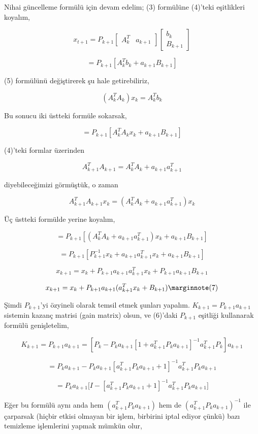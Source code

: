 \documentclass[12pt,fleqn]{article}\usepackage{../../common}
\begin{document}
Nihai güncelleme formülü için devam edelim; (3) formülüne (4)'teki
eşitlikleri koyalım,

$$ x_{t+1} = 
P_{k+1} 
\left[\begin{array}{cc} A_k^T & a_{k+1} \end{array}\right]  
\left[\begin{array}{c} b_k \\ B_{k+1} \end{array}\right]  
$$

$$ = P_{k+1} [A_k^Tb_k + a_{k+1}B_{k+1} ] $$

(5) formülünü değiştirerek şu hale getirebiliriz,

$$ (A_k^TA_k) x_k = A_k^T b_k $$

Bu sonucu iki üstteki formüle sokarsak, 

$$ = P_{k+1} [A_k^TA_kx_k + a_{k+1}B_{k+1} ] $$

(4)'teki formlar üzerinden 

$$ A_{k+1}^TA_{k+1} =  A_k^TA_k + a_{k+1}a_{k+1}^T  $$

diyebileceğimizi görmüştük, o zaman 

$$ A_{k+1}^TA_{k+1}x_k =  (A_k^TA_k + a_{k+1}a_{k+1}^T)x_k  $$

Üç üstteki formülde yerine koyalım,

$$ = P_{k+1} [(A_k^TA_k + a_{k+1}a_{k+1}^T)x_k + a_{k+1}B_{k+1} ] $$

$$ = P_{k+1} [P_{k+1}^{-1}x_k + a_{k+1}a_{k+1}^Tx_k + a_{k+1}B_{k+1} ] $$

$$ x_{k+1} = x_k + P_{k+1}a_{k+1}a_{k+1}^Tx_k  + P_{k+1}a_{k+1}B_{k+1}  $$

$$ 
x_{k+1} = x_k + P_{k+1}a_{k+1}(a_{k+1}^Tx_k  + B_{k+1})  
\mlabel{7}
$$

Şimdi $P_{k+1}$'yi özyineli olarak temsil etmek şunları yapalım. $K_{k+1} =
P_{k+1}a_{k+1}$  sistemin kazanç matrisi (gain matrix) olsun, ve (6)'daki 
$P_{k+1}$ eşitliği kullanarak formülü genişletelim,

$$ K_{k+1} = P_{k+1}a_{k+1} = 
[ P_k - P_k a_{k+1} [ 1 + a_{k+1}^T P_k a_{k+1} ]^{-1} a_{k+1}^TP_k ] a_{k+1}
$$

$$ = P_ka_{k+1} - P_k a_{k+1}[a_{k+1}^T P_k a_{k+1} + 1]^{-1} a_{k+1}^TP_ka_{k+1} $$

$$ = P_ka_{k+1} 
\big[ I - [ a_{k+1}^T P_k a_{k+1} + 1 ]^{-1} a_{k+1}^TP_ka_{k+1} \big] $$

Eğer bu formülü aynı anda hem $(a_{k+1}^TP_ka_{k+1})$ hem de $(a_{k+1}^TP_ka_{k+1})^{-1}$ 
ile çarparsak (hiçbir etkisi olmayan bir işlem, birbirini iptal ediyor
çünkü) bazı temizleme işlemlerini yapmak mümkün olur,
\end{document}
